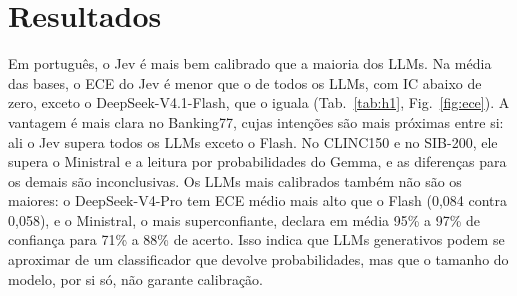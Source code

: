 \documentclass[sigconf,nonacm]{acmart}
\begin{document}
\begin{table}[t]
  \caption{Acurácia em inglês (C1) e variação do ECE ao passar ao português (C2$-$C1 e C3$-$C1); * IC 95\% exclui zero.}
  \label{tab:q2}
  \setlength{\tabcolsep}{4pt}
\end{table}

\section{Resultados}
Em português, o Jev é mais bem calibrado que a maioria dos LLMs. Na média das bases, o ECE do Jev é menor que o de todos os LLMs, com IC abaixo de zero, exceto o DeepSeek-V4.1-Flash, que o iguala (Tab.~\ref{tab:h1}, Fig.~\ref{fig:ece}). A vantagem é mais clara no Banking77, cujas intenções são mais próximas entre si: ali o Jev supera todos os LLMs exceto o Flash. No CLINC150 e no SIB-200, ele supera o Ministral e a leitura por probabilidades do Gemma, e as diferenças para os demais são inconclusivas. Os LLMs mais calibrados também não são os maiores: o DeepSeek-V4-Pro tem ECE médio mais alto que o Flash (0,084 contra 0,058), e o Ministral, o mais superconfiante, declara em média 95\% a 97\% de confiança para 71\% a 88\% de acerto. Isso indica que LLMs generativos podem se aproximar de um classificador que devolve probabilidades, mas que o tamanho do modelo, por si só, não garante calibração.
\end{document}
